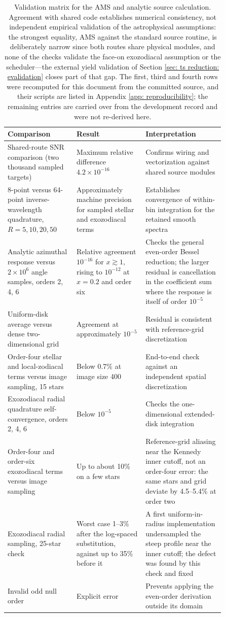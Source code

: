 \documentclass[12pt,a4paper]{article}
\numberwithin{equation}{section}
\numberwithin{figure}{section}
\numberwithin{table}{section}
\begin{document}
\begin{table}[htbp]
\centering
\small
\renewcommand{\arraystretch}{1.25}
\begin{tabular}{@{}p{0.27\linewidth}p{0.27\linewidth}p{0.31\linewidth}@{}}
\toprule
Comparison & Result & Interpretation \\
\midrule
Shared-route SNR comparison (two thousand sampled targets) & Maximum relative difference $4.2\times10^{-16}$ & Confirms wiring and vectorization against shared source modules \\
8-point versus 64-point inverse-wavelength quadrature, $R=5,10,20,50$ & Approximately machine precision for sampled stellar and exozodiacal terms & Establishes convergence of within-bin integration for the retained smooth spectra \\
Analytic azimuthal response versus $2\times10^6$ angle samples, orders 2, 4, 6 & Relative agreement $10^{-16}$ for $x\gtrsim1$, rising to $10^{-12}$ at $x=0.2$ and order six & Checks the general even-order Bessel reduction; the larger residual is cancellation in the coefficient sum where the response is itself of order $10^{-5}$ \\
Uniform-disk average versus dense two-dimensional grid & Agreement at approximately $10^{-5}$ & Residual is consistent with reference-grid discretization \\
Order-four stellar and local-zodiacal terms versus image sampling, 15 stars & Below 0.7\% at image size 400 & End-to-end check against an independent spatial discretization \\
Exozodiacal radial quadrature self-convergence, orders 2, 4, 6 & Below $10^{-5}$ & Checks the one-dimensional extended-disk integration \\
Order-four and order-six exozodiacal terms versus image sampling & Up to about 10\% on a few stars & Reference-grid aliasing near the Kennedy inner cutoff, not an order-four error: the same stars and grid deviate by 4.5--5.4\% at order two \\
Exozodiacal radial sampling, 25-star check & Worst case 1--3\% after the log-spaced substitution, against up to 35\% before it & A first uniform-in-radius implementation undersampled the steep profile near the inner cutoff; the defect was found by this check and fixed \\
Invalid odd null order & Explicit error & Prevents applying the even-order derivation outside its domain \\
\bottomrule
\end{tabular}
\caption{Validation matrix for the AMS and analytic source calculation. Agreement with shared code establishes numerical consistency, not independent empirical validation of the astrophysical assumptions: the strongest equality, AMS against the standard source routine, is deliberately narrow since both routes share physical modules, and none of the checks validate the face-on exozodiacal assumption or the scheduler---the external yield validation of Section \ref{sec: ts reduction: evalidation} closes part of that gap. The first, third and fourth rows were recomputed for this document from the committed source, and their scripts are listed in Appendix \ref{app: reproducibility}; the remaining entries are carried over from the development record and were not re-derived here.}

\end{table}
\end{document}
